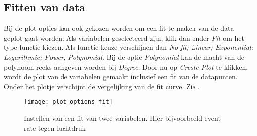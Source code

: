 \subsection{Fitten van data}

Bij de plot opties kan ook gekozen worden om een fit te maken van de
data geplot gaat worden. Als variabelen geselecteerd zijn, klik dan
onder \emph{Fit} om het type functie kiezen. Als functie-keuze
verschijnen dan \emph{No fit; Linear; Exponential; Logarithmic; Power;
Polynomial.} Bij de optie \emph{Polynomial} kan de macht van de polynoom
reeks aangeven worden bij \emph{Degree}. Door nu op \emph{Create Plot}
te klikken, wordt de plot van de variabelen gemaakt inclusief een fit
van de datapunten. Onder het plotje verschijnt de vergelijking van de
fit curve. Zie .

\begin{figure}
    \centering
    \texttt{[image: plot\_options\_fit]}
    \caption{Instellen van een fit van twee variabelen. Hier bijvoorbeeld
    event rate tegen luchtdruk}
    \label{fig:plot_options_fit}
\end{figure}



